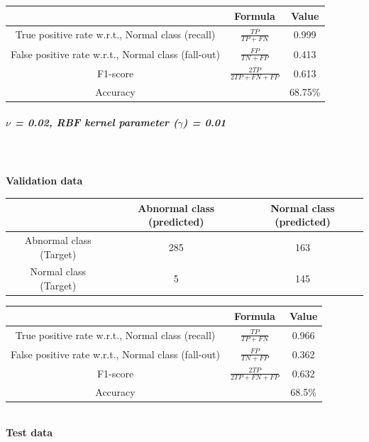 \documentclass[fleqn]{article}
\begin{document}
\begin{center}
  \begin{longtable}{ c | c | c }
  	\multicolumn{1}{c}{ } & 
	\multicolumn{1}{c}{Formula} & 
	\multicolumn{1}{c}{Value} \\\hline
	True positive rate w.r.t., Normal class (recall)  & $\frac{TP}{TP + FN}$ & 0.999 \\\hline
	False positive rate w.r.t., Normal class (fall-out)  & $\frac{FP}{TN + FP}$ & 0.413\\\hline
	F1-score & $\frac{2TP}{2TP + FN + FP}$ & 0.613\\\hline
	Accuracy & & 68.75\%\\\hline
  \end{longtable}
\end{center} 

\subparagraph{$\nu$ = 0.02, RBF kernel parameter ($\gamma$) = 0.01}
~\\\\
\textbf{Validation data}\\

\begin{center}
  \begin{longtable}{ c | c | c  }
	\multicolumn{1}{c}{ } & 
	\multicolumn{1}{c}{Abnormal class (predicted)} & 
	\multicolumn{1}{c}{Normal class (predicted)} \\
    \hline
    Abnormal class (Target)& 285 & 163 \\ \hline
    Normal class (Target)&  5 & 145 \\ \hline
  \end{longtable}
\end{center}    

\begin{center}
  \begin{longtable}{ c | c | c  }
  	\multicolumn{1}{c}{ } & 
	\multicolumn{1}{c}{Formula} & 
	\multicolumn{1}{c}{Value} \\\hline
	True positive rate w.r.t., Normal class (recall)  & $\frac{TP}{TP + FN}$ & 0.966 \\\hline
	False positive rate w.r.t., Normal class (fall-out)  & $\frac{FP}{TN + FP}$ & 0.362\\\hline
	F1-score & $\frac{2TP}{2TP + FN + FP}$ & 0.632\\\hline
	Accuracy  & & 68.5\%\\\hline
  \end{longtable}
\end{center} 


~\\
\textbf{Test data}\\
\end{document}
